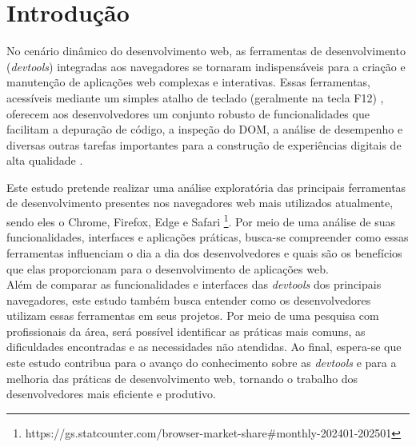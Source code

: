 \chapter{Introdução}
\label{chap:introducao}

No cenário dinâmico do desenvolvimento web, as ferramentas de desenvolvimento (\textit{devtools}) integradas aos navegadores se tornaram indispensáveis para a criação e manutenção de aplicações web complexas e interativas. Essas ferramentas, acessíveis mediante um simples atalho de teclado (geralmente na tecla F12) \cite{firefox}, oferecem aos desenvolvedores um conjunto robusto de funcionalidades que facilitam a depuração de código, a inspeção do DOM, a análise de desempenho e diversas outras tarefas importantes para a construção de experiências digitais de alta qualidade \cite{chrome}.

Este estudo pretende realizar uma análise exploratória das principais ferramentas de desenvolvimento presentes nos navegadores web mais utilizados atualmente, sendo eles o Chrome, Firefox, Edge e Safari \footnote{https://gs.statcounter.com/browser-market-share#monthly-202401-202501}. Por meio de uma análise de suas funcionalidades, interfaces e aplicações práticas, busca-se compreender como essas ferramentas influenciam o dia a dia dos desenvolvedores e quais são os benefícios que elas proporcionam para o desenvolvimento de aplicações web.\\

Além de comparar as funcionalidades e interfaces das \textit{devtools} dos principais navegadores, este estudo também busca entender como os desenvolvedores utilizam essas ferramentas em seus projetos. Por meio de uma pesquisa com profissionais da área, será possível identificar as práticas mais comuns, as dificuldades encontradas e as necessidades não atendidas. Ao final, espera-se que este estudo contribua para o avanço do conhecimento sobre as \textit{devtools} e para a melhoria das práticas de desenvolvimento web, tornando o trabalho dos desenvolvedores mais eficiente e produtivo.